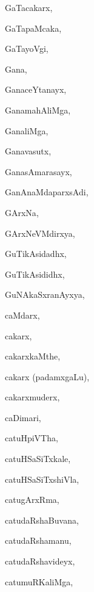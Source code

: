 \begin{multicols}{3}
{\noindent
{GaTacakarx}, \pageref{GaTacakarx}

\noindent
{GaTapaMcaka}, \pageref{GaTapaMcaka}

\noindent
{GaTayoVgi}, \pageref{GaTayoVgi}

\noindent
{Gana}, \pageref{Gana}

\noindent
{GanaceYtanayx}, \pageref{GanaceYtanayx}

\noindent
{GanamahAliMga}, \pageref{GanamahAliMga}

\noindent
{GanaliMga}, \pageref{GanaliMga}

\noindent
{Ganavasutx}, \pageref{Ganavasutx}

\noindent
{GanasAmarasayx}, \pageref{GanasAmarasayx}

\noindent
{GanAnaMdaparxsAdi}, \pageref{GanAnaMdaparxsAdi}

\noindent
{GArxNa}, \pageref{GArxNa}

\noindent
{GArxNeVMdirxya}, \pageref{GArxNeVMdirxya}

\noindent
{GuTikAsidadhx}, \pageref{GuTikAsidadhx}

\noindent
{GuTikAsididhx}, \pageref{GuTikAsididhx}

\noindent
{GuNAkaSxranAyxya}, \pageref{GuNAkaSxranAyxya}

\noindent
{caMdarx}, \pageref{caMdarx}

\noindent
{cakarx}, \pageref{cakarx}

\noindent
{cakarxkaMthe}, \pageref{cakarxkaMthe}

\noindent
{cakarx (padamxgaLu)}, \pageref{cakarx (padamxgaLu)}

\noindent
{cakarxmuderx}, \pageref{cakarxmuderx}

\noindent
{caDimari}, \pageref{caDimari}

\noindent
{catuHpiVTha}, \pageref{catuHpiVTha}

\noindent
{catuHSaSiTxkale}, \pageref{catuHSaSiTxkale}

\noindent
{catuHSaSiTxshiVla}, \pageref{catuHSaSiTxshiVla}

\noindent
{catugArxRma}, \pageref{catugArxRma}

\noindent
{catudaRshaBuvana}, \pageref{catudaRshaBuvana}

\noindent
{catudaRshamanu}, \pageref{catudaRshamanu}

\noindent
{catudaRshavideyx}, \pageref{catudaRshavideyx}

\noindent
{catumuRKaliMga}, \pageref{catumuRKaliMga}

}
\end{multicols}
